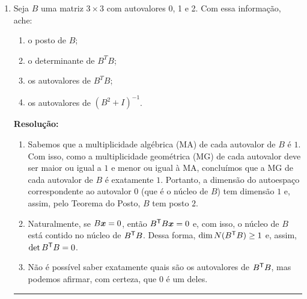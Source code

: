 \documentclass[leqno]{article}
\numberwithin{equation}{section}
\newenvironment{sol} 
{
    \vspace{4mm}
    \noindent\textbf{Resolução:}
    \strut\newline
    \smallskip
    \hspace{-3.5mm} 
} 
{\noindent\rule{4cm}{.1mm}}
\begin{document}
\begin{enumerate}


\item Seja $B$ uma matriz $3 \times 3$ com autovalores 0, 1 e 2. Com  essa informação, ache:

\begin{enumerate}

\item o posto de $B$;

\item o determinante de $B^TB$;

\item os autovalores de $B^TB$;

\item os autovalores de $(B^2 + I)^{-1}$.

\end{enumerate}

\begin{sol}

    \begin{enumerate}[label=(\alph*)]
        \item Sabemos que a multiplicidade algébrica (MA) de cada autovalor de \( B \) é \( 1 \).
            Com isso, como a multiplicidade geométrica (MG) de cada autovalor deve ser maior ou igual a \( 1 \) e menor ou igual à MA, concluímos que a MG de cada autovalor de \( B \) é exatamente \( 1 \).
            Portanto, a dimensão do autoespaço correspondente ao autovalor \( 0 \) (que é o núcleo de \( B \)) tem dimensão \( 1 \) e, assim, pelo Teorema do Posto, \( B \) tem posto \( 2 \).

        \item Naturalmente, se \( B \boldsymbol{x} = 0 \), então \( B^{ \mathsf{T} } B \boldsymbol{x} = 0 \) e, com isso, o núcleo de \( B \) está contido no núcleo de \( B^{ \mathsf{T} } B \).
            Dessa forma, \( \dim N ( B^{ \mathsf{T} } B ) \geq 1 \) e, assim, \( \det B^{ \mathsf{T} } B = 0 \).

        \item Não é possível saber exatamente quais são os autovalores de \( B^{ \mathsf{T} } B \), mas podemos afirmar, com certeza, que \( 0 \) é um deles.


\end{enumerate}
\end{sol}
\end{enumerate}
\end{document}
